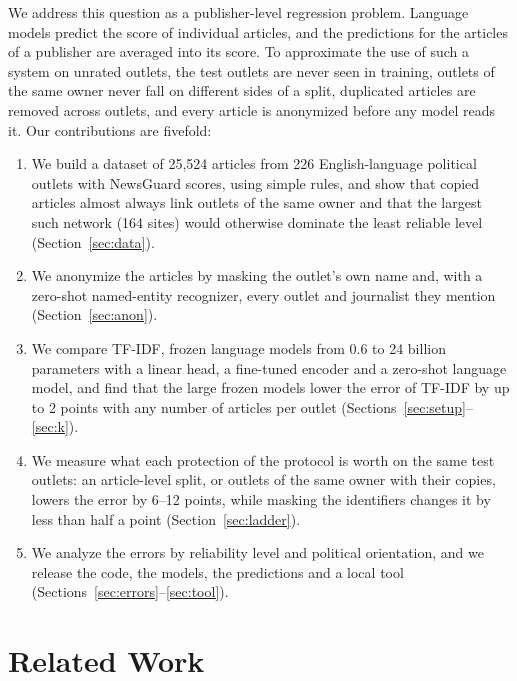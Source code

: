 \documentclass[11pt,a4paper]{article}
\begin{document}
We address this question as a publisher-level regression problem. Language models predict the score of individual
articles, and the predictions for the articles of a publisher are averaged into its score. To approximate the use of
such a system on unrated outlets, the test outlets are never seen in training, outlets of the same owner never fall on
different sides of a split, duplicated articles are removed across outlets, and every article is anonymized before any
model reads it. Our contributions are fivefold:
\begin{enumerate}
  \item We build a dataset of 25,524 articles from 226 English-language political outlets with NewsGuard scores, using
        simple rules, and show that copied articles almost always link outlets of the same owner and that the largest
        such network (164 sites) would otherwise dominate the least reliable level (Section~\ref{sec:data}).
  \item We anonymize the articles by masking the outlet's own name and, with a zero-shot named-entity recognizer, every
        outlet and journalist they mention (Section~\ref{sec:anon}).
  \item We compare TF-IDF, frozen language models from 0.6 to 24 billion parameters with a linear head, a fine-tuned
        encoder and a zero-shot language model, and find that the large frozen models lower the error of TF-IDF by up
        to 2 points with any number of articles per outlet (Sections~\ref{sec:setup}--\ref{sec:k}).
  \item We measure what each protection of the protocol is worth on the same test outlets: an article-level split, or
        outlets of the same owner with their copies, lowers the error by 6--12 points, while masking the identifiers
        changes it by less than half a point (Section~\ref{sec:ladder}).
  \item We analyze the errors by reliability level and political orientation, and we release the code, the models, the
        predictions and a local tool (Sections~\ref{sec:errors}--\ref{sec:tool}).
\end{enumerate}

\section{Related Work}\label{sec:related}
\end{document}
